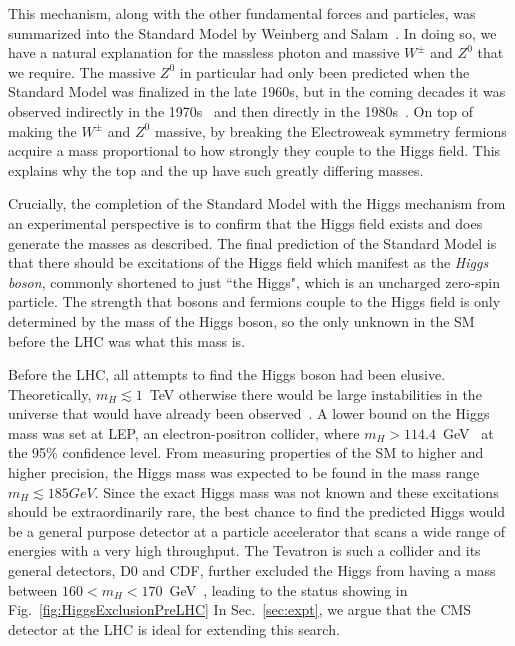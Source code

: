 This mechanism, along with the other fundamental forces and particles, was summarized into the Standard Model by Weinberg and Salam~\cite{Weinberg:1967tq,Salam:1968}. In doing so, we have a natural explanation for the massless photon and massive $W^{\pm}$ and $Z^{0}$ that we require. The massive $Z^{0}$ in particular had only been predicted when the Standard Model was finalized in the late 1960s, but in the coming decades it was observed indirectly in the 1970s~\cite{Hasert:1973ff} and then directly in the 1980s~\cite{Arnison:1983rp,Arnison:1983mk,Bagnaia:1983zx}. On top of making the $W^{\pm}$ and $Z^{0}$ massive, by breaking the Electroweak symmetry fermions acquire a mass proportional to how strongly they couple to the Higgs field. This explains why the top and the up have such greatly differing masses.

Crucially, the completion of the Standard Model with the Higgs mechanism from an experimental perspective is to confirm that the Higgs field exists and does generate the masses as described. The final prediction of the Standard Model is that there should be excitations of the Higgs field which manifest as the \textit{Higgs boson}, commonly shortened to just ``the Higgs", which is an uncharged zero-spin particle. The strength that bosons and fermions couple to the Higgs field is only determined by the mass of the Higgs boson, so the only unknown in the SM before the LHC was what this mass is.

Before the LHC, all attempts to find the Higgs boson had been elusive. Theoretically, $m_{H}\lesssim1$~TeV otherwise there would be large instabilities in the universe that would have already been observed~\cite{Sher:1989}. A lower bound on the Higgs mass was set at LEP, an electron-positron collider, where $m_{H}>114.4$~GeV~\cite{Barate:2003sz} at the 95\% confidence level. From measuring properties of the SM to higher and higher precision, the Higgs mass was expected to be found in the mass range $m_{H}\lesssim185GeV$. Since the exact Higgs mass was not known and these excitations should be extraordinarily rare, the best chance to find the predicted Higgs would be a general purpose detector at a particle accelerator that scans a wide range of energies with a very high throughput. The Tevatron is such a collider and its general detectors, D0 and CDF, further excluded the Higgs from having a mass between $160<m_{H}<170$~GeV~\cite{CDFandD0:2011aa}, leading to the status showing in Fig.~\ref{fig:HiggsExclusionPreLHC} In Sec.~\ref{sec:expt}, we argue that the CMS detector at the LHC is ideal for extending this search.

